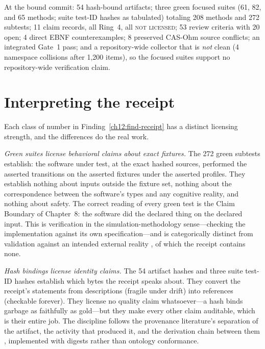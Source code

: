 \begin{finding}\label{ch12:find-receipt}
At the bound commit: 54 hash-bound artifacts; three green focused suites (61, 82, and 65 methods; suite test-ID hashes as tabulated) totaling 208 methods and 272 subtests; 11 claim records, all Ring~4, all \textsc{not licensed}; 53 review criteria with 20 open; 4 direct EBNF counterexamples; 8 preserved CAS-Ohm source conflicts; an integrated Gate~1 pass; and a repository-wide collector that is \emph{not} clean (4 namespace collisions after 1{,}200 items), so the focused suites support no repository-wide verification claim.
\end{finding}

\section{Interpreting the receipt}\label{ch12:interpret}

Each class of number in Finding~\ref{ch12:find-receipt} has a distinct licensing strength, and the differences do the real work.

\emph{Green suites license behavioral claims about exact fixtures.} The 272 green subtests establish: the software under test, at the exact hashed sources, performed the asserted transitions on the asserted fixtures under the asserted profiles. They establish nothing about inputs outside the fixture set, nothing about the correspondence between the software's types and any cognitive reality, and nothing about safety. The correct reading of every green test is the Claim Boundary of Chapter~8: the software did the declared thing on the declared input. This is verification in the simulation-methodology sense---checking the implementation against its own specification---and is categorically distinct from validation against an intended external reality \cite{sargent}, of which the receipt contains none.

\emph{Hash bindings license identity claims.} The 54 artifact hashes and three suite test-ID hashes establish which bytes the receipt speaks about. They convert the receipt's statements from descriptions (fragile under drift) into references (checkable forever). They license no quality claim whatsoever---a hash binds garbage as faithfully as gold---but they make every other claim auditable, which is their entire job. The discipline follows the provenance literature's separation of the artifact, the activity that produced it, and the derivation chain between them \cite{prov}, implemented with digests rather than ontology conformance.

